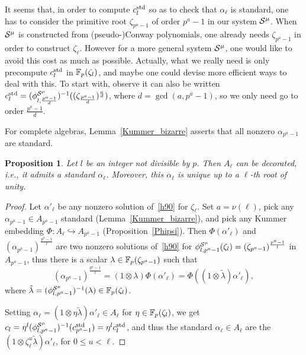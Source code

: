 \documentclass{sig-alternate}
\newtheorem{proposition}[theorem]{Proposition}
\begin{document}
It seems that, in order to compute $c^{\mathrm{std}}_l$
so as to check that $\alpha_\ell$ is standard, one has to
consider the primitive root $\zeta_{p^a-1}$ of order $p^a-1$ in our
system $\mathcal{S}^\mu$.
When $\mathcal{S}^\mu$ is constructed from (pseudo-)Conway polynomials,
one already needs $\zeta_{p^a-1}$ in order to construct $\zeta_\ell$.
However for a more general system $\mathcal{S}^\mu$, one would like to avoid this cost
as much as possible.
Actually, what we really need is only
precompute $c^{\mathrm{std}}_l$ in $\mathbb{F}_p(\zeta_l)$,
and maybe one could devise more efficient ways to deal with this.
To start with, observe it can also be written
$c^{\mathrm{std}}_l=({\phi^{\mathcal{S}^\mu}_{{l},{\frac{p^a-1}{d}}}})^{-1}((\zeta_{\frac{p^a-1}{d}})^{\frac{a}{d}})$,
where $d=\gcd(a,p^a-1)$, so we only need go to order $\frac{p^a-1}{d}$.

For complete algebras, Lemma~\ref{Kummer_bizarre} asserts that all nonzero $\alpha_{p^a-1}$ are standard.
\begin{proposition}
\label{standardexiste}
Let $l$ be an integer not divisible by $p$.
Then $A_\ell$ can be decorated, i.e., it admits a standard $\alpha_\ell$.
Moreover, this $\alpha_\ell$ is unique up to a $\ell$-th root of unity.
\end{proposition}
\begin{proof}
Let $\alpha'_\ell$ be any nonzero solution of~\eqref{h90} for $\zeta_\ell$.
Set $a=\nu(\ell)$, pick any $\alpha_{p^a-1}\in A_{p^a-1}$ standard (Lemma~\ref{Kummer_bizarre}),
and pick any Kummer embedding $\Phi:A_\ell\hookrightarrow A_{p^a-1}$ (Proposition~\ref{Phipsi}).
Then $\Phi(\alpha'_\ell)$ and $(\alpha_{p^a-1})^{\frac{p^a-1}{\ell}}$ are two nonzero solutions of~\eqref{h90}
for ${\phi^{\mathcal{S}^\mu}_{{l},{p^a-1}}}(\zeta_l)=(\zeta_{p^a-1})^{\frac{p^a-1}{l}}$ in $A_{p^a-1}$, thus there is a scalar $\lambda\in\mathbb{F}_{p}(\zeta_{p^a-1})$
such that
\begin{equation*}
(\alpha_{p^a-1})^{\frac{p^a-1}{\ell}}=(1\otimes\lambda)\Phi(\alpha'_\ell)=\Phi((1\otimes\tilde\lambda)\alpha'_\ell),
\end{equation*}
where $\tilde\lambda=({\phi^{\mathcal{S}^\mu}_{{l},{p^a-1}}})^{-1}(\lambda)\in\mathbb{F}_{p}(\zeta_{l})$.

Setting $\alpha_\ell=(1\otimes\eta\tilde\lambda)\alpha'_\ell\in A_\ell$ for $\eta\in\mathbb{F}_{p}(\zeta_l)$,
we get $c_{l}=\eta^l({\phi^{\mathcal{S}^\mu}_{{l},{p^a-1}}})^{-1}(c^{\mathrm{std}}_{p^a-1})=\eta^lc^{\mathrm{std}}_l$, and
thus the standard $\alpha_\ell\in A_\ell$ are the $(1\otimes\zeta_\ell^u\tilde\lambda)\alpha'_\ell$, for $0\leq u<\ell$.
\end{proof}
\end{document}
